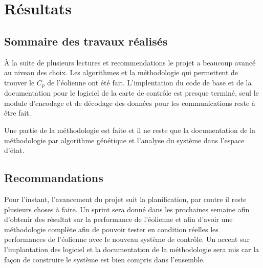 \section{Résultats} %
\label{sec:resultats}

\subsection{Sommaire des travaux réalisés} %
\label{sub:Sommaire des travaux réalisés}

À la suite de plusieurs lectures et recommendations le projet a beaucoup avancé au niveau des choix. Les algorithmes et la méthodologie qui permettent de trouver le $C_p$ de l'éolienne ont été fait. L'implentation du code de base et de la documentation pour le logiciel de la carte de contrôle est presque terminé, seul le module d'encodage et de décodage des données pour les communications reste à être fait.

Une partie de la méthodologie est faite et il ne reste que la documentation de la méthodologie par algorithme génétique et l'analyse du système dans l'espace d'état.

\subsection{Recommandations} %
\label{subsec:Recommandations}

Pour l'instant, l'avancement du projet suit la planification, par contre il reste plusieurs choses à faire. Un sprint sera donné dans les prochaines semaine afin d'obtenir des résultat sur la performance de l'éolienne et afin d'avoir une méthodologie complète afin de pouvoir tester en condition réelles les performances de l'éolienne avec le nouveau système de contrôle. Un accent sur l'implantation des logiciel et la documentation de la méthodologie sera mis car la façon de construire le système est bien compris dans l'ensemble.

